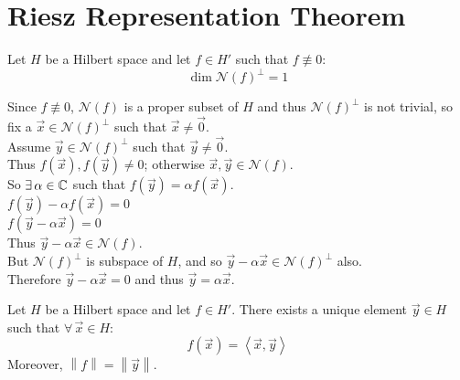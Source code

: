 \documentclass[letterpaper,12pt,fleqn]{article}
\newcommand{\vx}{\vec{x}}
\newcommand{\vy}{\vec{y}}
\newcommand{\vo}{\vec{0}}
\newcommand{\norm}[1]{\left\|#1\right\|}
\newcommand{\inner}[1]{\left<#1\right>}
\newcommand{\mn}{\mathcal{N}}
\renewcommand{\a}{\alpha}
\begin{document}
\section*{Riesz Representation Theorem}

\begin{lemma}
  Let $H$ be a Hilbert space and let $f\in H'$ such that $f\not\equiv0$:
  \[\dim \mn(f)^{\perp}=1\]
\end{lemma}


\begin{theproof}
  Since $f\not\equiv0$, $\mn(f)$ is a proper subset of $H$ and thus
  $\mn(f)^{\perp}$ is not trivial, so fix a $\vx\in\mn(f)^{\perp}$ such that
  $\vx\ne\vo$. \\
  Assume $\vy\in\mn(f)^{\perp}$ such that $\vy\ne\vo$. \\
  Thus $f(\vx),f(\vy)\ne0$; otherwise $\vx,\vy\in\mn(f)$. \\
  So $\exists\,\a\in\C$ such that $f(\vy)=\a f(\vx)$. \\
  $f(\vy)-\a f(\vx)=0$ \\
  $f(\vy-\a\vx)=0$ \\
  Thus $\vy-\a\vx\in\mn(f)$. \\
  But $\mn(f)^{\perp}$ is subspace of $H$, and so $\vy-\a\vx\in\mn(f)^{\perp}$
  also. \\
  Therefore $\vy-\a\vx=0$ and thus $\vy=\a\vx$.
\end{theproof}

\begin{theorem}[Riesz]
  Let $H$ be a Hilbert space and let $f\in H'$. There exists a unique element
  $\vy\in H$ such that $\forall\,\vx\in H$:
  \[f(\vx)=\inner{\vx,\vy}\]
  Moreover, $\norm{f}=\norm{\vy}$.
\end{theorem}

\newpage
\end{document}

